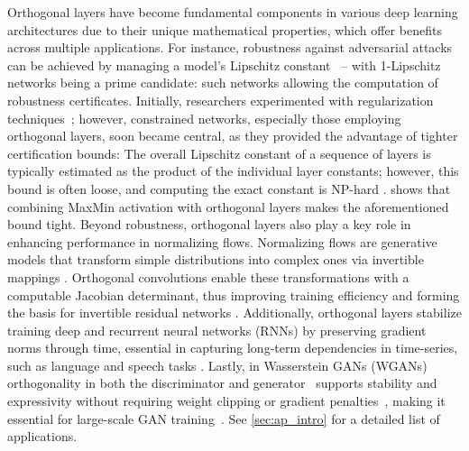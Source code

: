 


Orthogonal layers have become fundamental components in various deep learning architectures due to their unique mathematical properties, which offer benefits across multiple applications. 
For instance, robustness against adversarial attacks can be achieved by managing a model’s Lipschitz constant~\cite{szegedy_intriguing_2013} -- with 1-Lipschitz networks being a prime candidate: such networks allowing the computation of robustness certificates. 
Initially, researchers experimented with regularization techniques~\cite{cisse2017parseval}; however, constrained networks, especially those employing orthogonal layers, soon became central, as they provided the advantage of tighter certification bounds: The overall Lipschitz constant of a sequence of layers is typically estimated as the product of the individual layer constants; however, this bound is often loose, and computing the exact constant is NP-hard \cite{virmaux2018lipschitz}. \citep{anil_sorting_2019} 
shows that combining MaxMin activation with orthogonal layers makes the aforementioned bound tight.
Beyond robustness, orthogonal layers also play a key role in enhancing performance in normalizing flows. Normalizing flows are generative models that transform simple distributions into complex ones via invertible mappings \cite{dinh2016density, rezende2015variational}.  Orthogonal convolutions enable these transformations with a computable Jacobian determinant, thus improving training efficiency \cite{kingma2018glow} and forming the basis for invertible residual networks \cite{behrmann2019invertible}.
Additionally, orthogonal layers stabilize training deep and recurrent neural networks (RNNs) by preserving gradient norms through time, essential in capturing long-term dependencies in time-series, such as language and speech tasks \cite{kiani_projunn_2022,qi_deep_isometric_2020, bansal2018gainorthogonalityregularizationstraining}. Lastly, in Wasserstein GANs (WGANs) \cite{arjovsky2017wasserstein} orthogonality in both the discriminator and generator~\cite{muller2019orthogonal} supports stability and expressivity without requiring weight clipping or gradient penalties~\cite{gulrajani2017improved}, making it essential for large-scale GAN training~\cite{brock2018large, miyato2018spectral}.
See \cref{sec:ap_intro} for a detailed list of applications.


